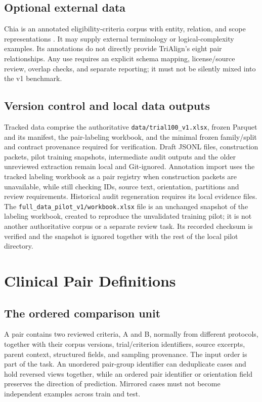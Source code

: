 \documentclass[10pt,letterpaper]{article}
\newcommand{\pathcode}[1]{\nolinkurl{#1}}
\begin{document}
\subsection{Optional external data}
Chia is an annotated eligibility-criteria corpus with entity, relation, and
scope representations \cite{chia}. It may supply external terminology or
logical-complexity examples. Its annotations do not directly provide
TriAlign's eight pair relationships. Any use requires an explicit schema
mapping, license/source review, overlap checks, and separate reporting; it
must not be silently mixed into the v1 benchmark.

\subsection{Version control and local data outputs}
Tracked data comprise the authoritative \pathcode{data/trial100_v1.xlsx},
frozen Parquet and its manifest, the pair-labeling workbook, and the minimal
frozen family/split and contract provenance required for verification. Draft
JSONL files, construction packets, pilot training snapshots, intermediate audit
outputs and the older unreviewed extraction remain local and Git-ignored.
Annotation import uses the tracked labeling workbook as a pair registry when
construction packets are unavailable, while still checking IDs, source text,
orientation, partitions and review requirements. Historical audit regeneration
requires its local evidence files. The \pathcode{full_data_pilot_v1/workbook.xlsx}
file is an unchanged snapshot of the labeling workbook, created to reproduce
the unvalidated training pilot; it is not another authoritative corpus or a
separate review task. Its recorded checksum is verified and the snapshot is
ignored together with the rest of the local pilot directory.

\section{Clinical Pair Definitions}
\label{sec:pairs}

\subsection{The ordered comparison unit}
A pair contains two reviewed criteria, A and B, normally from different
protocols, together with their corpus versions, trial/criterion identifiers,
source excerpts, parent context, structured fields, and sampling provenance.
The input order is part of the task. An unordered pair-group identifier can
deduplicate cases and hold reversed views together, while an ordered pair
identifier or orientation field preserves the direction of prediction.
Mirrored cases must not become independent examples across train and test.
\end{document}
